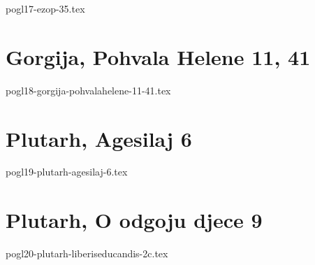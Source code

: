 \documentclass[a4paper,12pt,twoside]{report}
\begin{document}
{pogl17-ezop-35.tex}

\chapter{Gorgija, Pohvala Helene 11, 41}

{pogl18-gorgija-pohvalahelene-11-41.tex}

\chapter{Plutarh, Agesilaj 6}

{pogl19-plutarh-agesilaj-6.tex}

\chapter{Plutarh, O odgoju djece 9}

{pogl20-plutarh-liberiseducandis-2c.tex}


\tableofcontents
\end{document}
